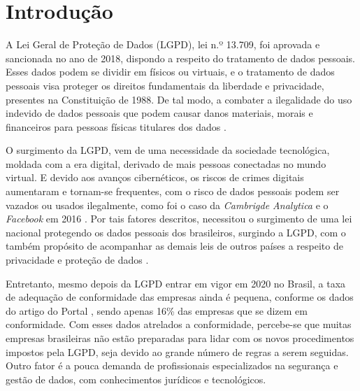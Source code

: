 \documentclass[
	12pt,				%
	openright,			%
	oneside,			%
	a4paper,			%
	english,			%
	french,				%
	spanish,			%
	brazil,				%
	]{abntex2}
\begin{document}

\tableofcontents*



\textual
\setcounter{page}{1}
\chapter*{Introdução}
\label{chapter:introducao}
A Lei Geral de Proteção de Dados (LGPD), lei n.º 13.709, foi aprovada e sancionada no ano de 2018, dispondo a respeito do tratamento de dados pessoais. Esses dados podem se dividir em físicos ou virtuais, e o tratamento de dados pessoais visa proteger os direitos fundamentais da liberdade e privacidade, presentes na Constituição de 1988. De tal modo, a combater a ilegalidade do uso indevido de dados pessoais que podem causar danos materiais, morais e financeiros para pessoas físicas titulares dos dados \cite{01-01-LeiGeral}. 

O surgimento da LGPD, vem de uma necessidade da sociedade tecnológica, moldada com a era digital, derivado de mais pessoas conectadas no mundo virtual. E devido aos avanços cibernéticos, os riscos de crimes digitais aumentaram e tornam-se frequentes, com o risco de dados pessoais podem ser vazados ou usados ilegalmente, como foi o caso da \textit{Cambrigde Analytica} e o \textit{Facebook} em 2016 \cite{01-03-OlharDigital}. Por tais fatores descritos, necessitou o surgimento de uma lei nacional protegendo os dados pessoais dos brasileiros, surgindo a LGPD, com o também propósito de acompanhar as demais leis de outros países a respeito de privacidade e proteção de dados \cite{01-02-Senado}.

Entretanto, mesmo depois da LGPD entrar em vigor em 2020 no Brasil, a taxa de adequação de conformidade das empresas ainda é pequena, conforme os dados do artigo do Portal , sendo apenas 16\% das empresas que se dizem em conformidade. Com esses dados atrelados a conformidade, percebe-se que muitas empresas brasileiras não estão preparadas para lidar com os novos procedimentos impostos pela LGPD, seja devido ao grande número de regras a serem seguidas. Outro fator é a pouca demanda de profissionais especializados na segurança e gestão de dados, com conhecimentos jurídicos e tecnológicos. 
\end{document}
